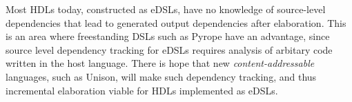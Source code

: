 \documentclass[sigplan,review,nonacm,9pt]{acmart}
\begin{document}
Most HDLs today, constructed as eDSLs, have no knowledge of source-level dependencies that lead to generated output dependencies after elaboration.
This is an area where freestanding DSLs such as Pyrope have an advantage, since source level dependency tracking for eDSLs requires analysis of arbitary code written in the host language.
There is hope that new \textit{content-addressable} languages, such as Unison\cite{unison}, will make such dependency tracking, and thus incremental elaboration viable for HDLs implemented as eDSLs.

%
%
%


\end{document}
